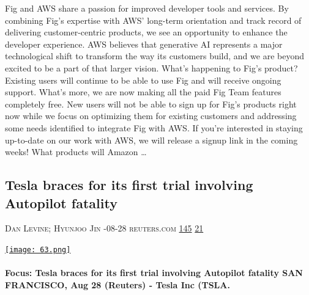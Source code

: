 \documentclass[10pt,a4paper]{article}
\begin{document}
\begin{multicols}{2}
Fig and AWS share a passion for improved developer tools and services. By combining Fig's expertise with AWS' long-term orientation and track record of delivering customer-centric products, we see an opportunity to enhance the developer experience. AWS believes that generative AI represents a major technological shift to transform the way its customers build, and we are beyond excited to be a part of that larger vision.
What's happening to Fig's product?
Existing users will continue to be able to use Fig and will receive ongoing support. What's more, we are now making all the paid Fig Team features completely free. New users will not be able to sign up for Fig's products right now while we focus on optimizing them for existing customers and addressing some needs identified to integrate Fig with AWS. If you're interested in staying up-to-date on our work with AWS, we will release a signup link in the coming weeks!
What products will Amazon
\dots\par
\noindent\begin{minipage}{\linewidth}
\medskip
\subsection{Tesla braces for its first trial involving Autopilot fatality}
\textsc{\footnotesize
{\scriptsize\faUser}\space 
Dan Levine; Hyunjoo Jin 
{\scriptsize\faCalendar}-08-28 
{\scriptsize\faGlobe}\space 
reuters.com 
{\scriptsize\faThumbsOUp}\space 
\href{http://news.ycombinator.com/item?id=37293103\&utm\_term=comment}{145} 
{\scriptsize\faComments}\space 
\href{http://news.ycombinator.com/item?id=37293103\&utm\_term=comment}{21} 
}
\par\medskip\noindent
\href{https://www.reuters.com/business/autos-transportation/tesla-braces-its-first-trial-involving-autopilot-fatality-2023-08-28/?utm\_source=hackernewsletter\&utm\_medium=email\&utm\_term=startup\_news}{
    \texttt{[image: 63.png]}
}
\end{minipage}
\paragraph{}
\textbf{Focus: Tesla braces for its first trial involving Autopilot fatality
SAN FRANCISCO, Aug 28 (Reuters) - Tesla Inc (TSLA.}

\end{multicols}
\end{document}
